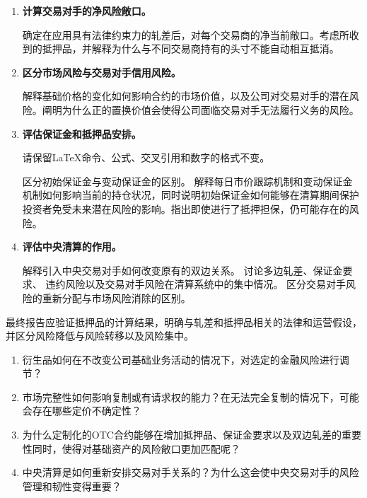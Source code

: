 \begin{enumerate}

\item \textbf{计算交易对手的净风险敞口。}

确定在应用具有法律约束力的轧差后，对每个交易商的净当前敞口。考虑所收到的抵押品，并解释为什么与不同交易商持有的头寸不能自动相互抵消。

\item \textbf{区分市场风险与交易对手信用风险。}

解释基础价格的变化如何影响合约的市场价值，以及公司对交易对手的潜在风险。阐明为什么正的置换价值会使得公司面临交易对手无法履行义务的风险。

\item \textbf{评估保证金和抵押品安排。}

请保留LaTeX命令、公式、交叉引用和数字的格式不变。

区分初始保证金与变动保证金的区别。
解释每日市价跟踪机制和变动保证金机制如何影响当前的持仓状况，同时说明初始保证金如何能够在清算期间保护投资者免受未来潜在风险的影响。指出即使进行了抵押担保，仍可能存在的风险。

\item \textbf{评估中央清算的作用。}

解释引入中央交易对手如何改变原有的双边关系。
讨论多边轧差、保证金要求、
违约风险以及交易对手风险在清算系统中的集中情况。
区分交易对手风险的重新分配与市场风险消除的区别。

\end{enumerate}

最终报告应验证抵押品的计算结果，明确与轧差和抵押品相关的法律和运营假设，并区分风险降低与风险转移以及风险集中。



\begin{enumerate}

\item 衍生品如何在不改变公司基础业务活动的情况下，对选定的金融风险进行调节？

\item 市场完整性如何影响复制或有请求权的能力？在无法完全复制的情况下，可能会存在哪些定价不确定性？

\item 为什么定制化的OTC合约能够在增加抵押品、保证金要求以及双边轧差的重要性同时，使得对基础资产的风险敞口更加匹配呢？

\item 中央清算是如何重新安排交易对手关系的？为什么这会使中央交易对手的风险管理和韧性变得重要？

\end{enumerate}

